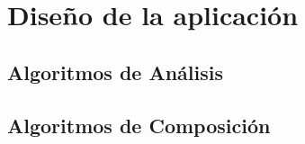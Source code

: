 \chapter{Diseño de la aplicación}

\section{Algoritmos de Análisis}

\section{Algoritmos de Composición}
\label{sec:algcomp}